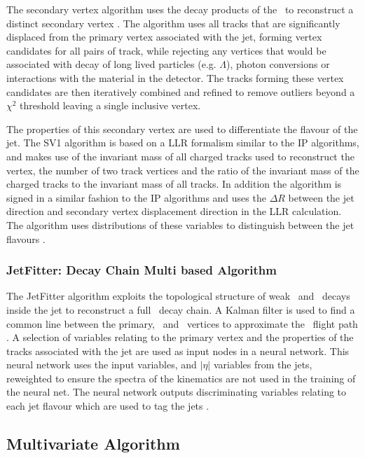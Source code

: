 		The secondary vertex algorithm uses the decay products of the \bhadron\ to reconstruct a distinct secondary vertex \cite{IP3D}. The algorithm uses all tracks that are significantly displaced from the primary vertex associated with the jet, forming vertex candidates for all pairs of track, while rejecting any vertices that would be associated with decay of long lived particles (e.g. $\Lambda$), photon conversions or interactions with the material in the detector. The tracks forming these vertex candidates are then iteratively combined and refined to remove outliers beyond a $\chi^2$ threshold leaving a single inclusive vertex.

		The properties of this secondary vertex are used to differentiate the flavour of the jet. The SV1 algorithm is based on a LLR formalism similar to the IP algorithms, and makes use of the invariant mass of all charged tracks used to reconstruct the vertex, the number of two track vertices and the ratio of the invariant mass of the charged tracks to the invariant mass of all tracks. In addition the algorithm is signed in a similar fashion to the IP algorithms and uses the $\Delta R$ between the jet direction and secondary vertex displacement direction in the LLR calculation. The algorithm uses distributions of these variables to distinguish between the jet flavours \cite{btagOptimisation, bTagPerformance}.

	\subsubsection{JetFitter: Decay Chain Multi based Algorithm}
	\label{det:btag:jf}

		The JetFitter algorithm exploits the topological structure of weak \bhadron\ and \chadron\ decays inside the jet to reconstruct a full \bhadron\ decay chain. A Kalman filter is used to find a common line between the primary, \bhadron\ and \chadron\ vertices to approximate the \bhadron\ flight path \cite{jetfitter}. A selection of variables relating to the primary vertex and the properties of the tracks associated with the jet are used as input nodes in a neural network. This neural network uses the input variables, \pt and $|\eta|$ variables from the jets, reweighted to ensure the spectra of the kinematics are not used in the training of the neural net. The neural network outputs discriminating variables relating to each jet flavour which are used to tag the jets \cite{bTagPerformance}.

	\subsection{Multivariate Algorithm}
	\label{det:btag:mv}

